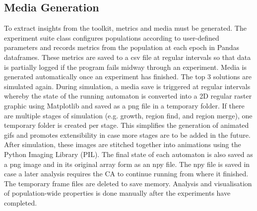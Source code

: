 \subsection{Media Generation}
To extract insights from the toolkit, metrics and media must be generated. The experiment suite class configures populations according to user-defined parameters and records metrics from the population at each epoch in Pandas dataframes. These metrics are saved to a csv file at regular intervals so that data is partially logged if the program fails midway through an experiment. Media is generated automatically once an experiment has finished. The top 3 solutions are simulated again. During simulation, a media save is triggered at regular intervals whereby the state of the running automaton is converted into a 2D regular raster graphic using Matplotlib and saved as a png file in a temporary folder. If there are multiple stages of simulation (e.g. growth, region find, and region merge), one temporary folder is created per stage. This simplifies the generation of animated gifs and promotes extensibility in case more stages are to be added in the future. After simulation, these images are stitched together into animations using the Python Imaging Library (PIL). The final state of each automaton is also saved as a png image and in its original array form as an npy file. The npy file is saved in case a later analysis requires the CA to continue running from where it finished. The temporary frame files are deleted to save memory. Analysis and visualisation of population-wide properties is done manually after the experiments have completed.